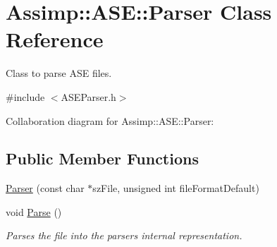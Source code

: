 \hypertarget{class_assimp_1_1_a_s_e_1_1_parser}{\section{Assimp\+:\+:A\+S\+E\+:\+:Parser Class Reference}
\label{class_assimp_1_1_a_s_e_1_1_parser}
}


Class to parse A\+S\+E files.  




{\ttfamily \#include $<$A\+S\+E\+Parser.\+h$>$}



Collaboration diagram for Assimp\+:\+:A\+S\+E\+:\+:Parser\+:
\subsection*{Public Member Functions}
\begin{DoxyCompactItemize}
\item 
\hyperlink{class_assimp_1_1_a_s_e_1_1_parser_ad105bd959358622ac0c2aab3ed7b9013}{Parser} (const char $\ast$sz\+File, unsigned int file\+Format\+Default)
\item 
\hypertarget{class_assimp_1_1_a_s_e_1_1_parser_aa55266b2875ee4ab02f8b311a56e7fc3}{void \hyperlink{class_assimp_1_1_a_s_e_1_1_parser_aa55266b2875ee4ab02f8b311a56e7fc3}{Parse} ()}\label{class_assimp_1_1_a_s_e_1_1_parser_aa55266b2875ee4ab02f8b311a56e7fc3}

\begin{DoxyCompactList}\small\item\em Parses the file into the parsers internal representation. \end{DoxyCompactList}\end{DoxyCompactItemize}
